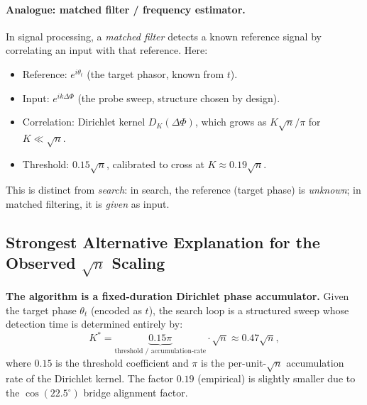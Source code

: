 \documentclass[12pt,a4paper]{article}
\theoremstyle{plain}
\theoremstyle{definition}
\theoremstyle{remark}
\begin{document}
\paragraph{Analogue: matched filter / frequency estimator.}
In signal processing, a \emph{matched filter} detects a known reference
signal by correlating an input with that reference.  Here:
\begin{itemize}
  \item Reference: $e^{i\theta_t}$ (the target phasor, known from $t$).
  \item Input: $e^{ik\Delta\Phi}$ (the probe sweep, structure chosen by design).
  \item Correlation: Dirichlet kernel $D_K(\Delta\Phi)$, which grows as
        $K\sqrt{n}/\pi$ for $K \ll \sqrt{n}$.
  \item Threshold: $0.15\sqrt{n}$, calibrated to cross at $K \approx 0.19\sqrt{n}$.
\end{itemize}
This is distinct from \emph{search}: in search, the reference (target phase) is
\emph{unknown}; in matched filtering, it is \emph{given} as input.

\subsection{Strongest Alternative Explanation for the Observed $\sqrt{n}$ Scaling}
\label{sec:alternative}

\textbf{The algorithm is a fixed-duration Dirichlet phase accumulator.}
Given the target phase $\theta_t$ (encoded as $t$), the search loop is a
structured sweep whose detection time is determined entirely by:
\begin{equation}
  K^* = \underbrace{0.15\pi}_{\text{threshold / accumulation-rate}}
        \cdot \sqrt{n}
      \approx 0.47\sqrt{n},
\end{equation}
where $0.15$ is the threshold coefficient and $\pi$ is the per-unit-$\sqrt{n}$
accumulation rate of the Dirichlet kernel.  The factor $0.19$ (empirical) is
slightly smaller due to the $\cos(22.5^\circ)$ bridge alignment factor.
\end{document}
